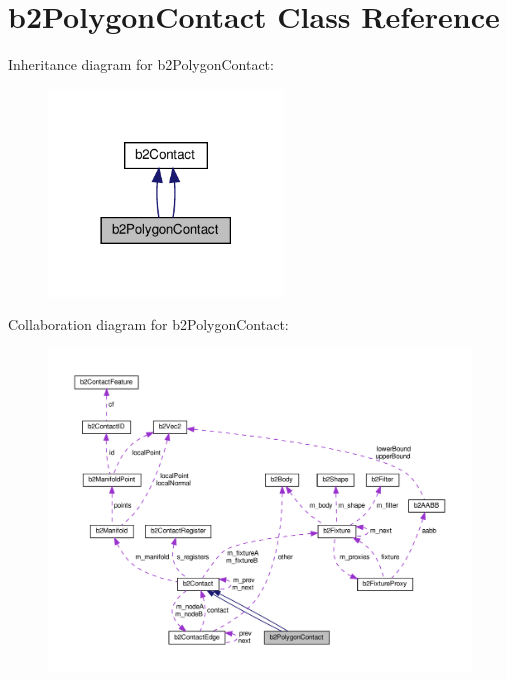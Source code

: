 \hypertarget{classb2PolygonContact}{}\section{b2\+Polygon\+Contact Class Reference}
\label{classb2PolygonContact}


Inheritance diagram for b2\+Polygon\+Contact\+:
\nopagebreak
\begin{figure}[H]
\begin{center}
\leavevmode
\includegraphics[width=177pt]{classb2PolygonContact__inherit__graph}
\end{center}
\end{figure}


Collaboration diagram for b2\+Polygon\+Contact\+:
\nopagebreak
\begin{figure}[H]
\begin{center}
\leavevmode
\includegraphics[width=350pt]{classb2PolygonContact__coll__graph}
\end{center}
\end{figure}
